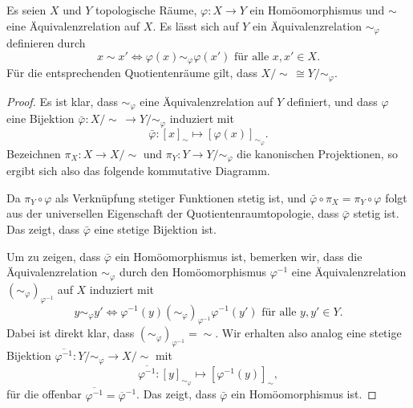 \documentclass[a4paper,10pt]{article}
\begin{document}
\section{}
\begin{lem}\label{lem: indzuierte äquivalenzrelation}
 Es seien $X$ und $Y$ topologische Räume, $\varphi : X \to Y$ ein Homöomorphismus und $\sim$ eine Äquivalenzrelation auf $X$. Es lässt sich auf $Y$ ein Äquivalenzrelation $\sim_\varphi$ definieren durch
 \[
  x \sim x' \Leftrightarrow \varphi(x) \sim_\varphi \varphi(x') \text{ für alle } x, x' \in X.
 \]
 Für die entsprechenden Quotientenräume gilt, dass $X/\!\sim\, \cong Y/\!\sim_\varphi$.
\end{lem}
\begin{proof}
 Es ist klar, dass $\sim_\varphi$ eine Äquivalenzrelation auf $Y$ definiert, und dass $\varphi$ eine Bijektion $\bar{\varphi} : X/\!\sim\, \to Y/\!\sim_\varphi$ induziert mit
 \[
  \bar{\varphi} : [x]_\sim \mapsto [\varphi(x)]_{\sim_\varphi}.
 \]
 Bezeichnen $\pi_X : X \to X/\sim$ und $\pi_Y : Y \to Y/\sim_\varphi$ die kanonischen Projektionen, so ergibt sich also das folgende kommutative Diagramm.
 \begin{center}
 \end{center}
 
 Da $\pi_Y \circ \varphi$ als Verknüpfung stetiger Funktionen stetig ist, und $\bar{\varphi} \circ \pi_X = \pi_Y \circ \varphi$ folgt aus der universellen Eigenschaft der Quotientenraumtopologie, dass $\bar{\varphi}$ stetig ist. Das zeigt, dass $\bar{\varphi}$ eine stetige Bijektion ist.
 
 Um zu zeigen, dass $\bar{\varphi}$ ein Homöomorphismus ist, bemerken wir, dass die Äquivalenzrelation $\sim_\varphi$ durch den Homöomorphismus $\varphi^{-1}$ eine Äquivalenzrelation $(\sim_\varphi)_{\varphi^{-1}}$ auf $X$ induziert mit
 \[
  y \sim_\varphi y' \Leftrightarrow \varphi^{-1}(y) (\sim_\varphi)_{\varphi^{-1}} \varphi^{-1}(y') \text{ für alle } y,y' \in Y.
 \]
 Dabei ist direkt klar, dass $(\sim_\varphi)_{\varphi^{-1}} = \sim$. Wir erhalten also analog eine stetige Bijektion $\overline{\varphi^{-1}} : Y/\!\sim_\varphi \to X/\!\sim$ mit
 \[
  \overline{\varphi^{-1}} : [y]_{\sim_\varphi} \mapsto [\varphi^{-1}(y)]_\sim,
 \]
 für die offenbar $\overline{\varphi^{-1}} = \overline{\varphi}^{-1}$. Das zeigt, dass $\bar{\varphi}$ ein Homöomorphismus ist.
\end{proof}
\end{document}
